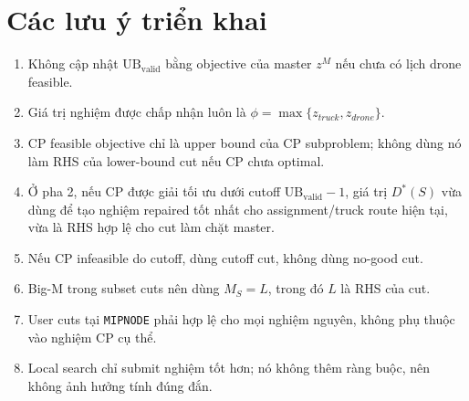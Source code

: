 \documentclass[12pt,a4paper]{article}
\newcommand{\UBV}{\mathrm{UB}_{\mathrm{valid}}}
\begin{document}
\section{Các lưu ý triển khai}
\label{sec:implementation-notes}

\begin{enumerate}[leftmargin=2em]
    \item Không cập nhật $\UBV$ bằng objective của master $z^M$ nếu chưa có lịch drone feasible.
    \item Giá trị nghiệm được chấp nhận luôn là $\phi=\max\{z_{truck},z_{drone}\}$.
    \item CP feasible objective chỉ là upper bound của CP subproblem; không dùng nó làm RHS của lower-bound cut nếu CP chưa optimal.
    \item Ở pha 2, nếu CP được giải tối ưu dưới cutoff $\UBV-1$, giá trị $D^*(S)$ vừa dùng để tạo nghiệm repaired tốt nhất cho assignment/truck route hiện tại, vừa là RHS hợp lệ cho cut làm chặt master.
    \item Nếu CP infeasible do cutoff, dùng cutoff cut, không dùng no-good cut.
    \item Big-M trong subset cuts nên dùng $M_S=L$, trong đó $L$ là RHS của cut.
    \item User cuts tại \texttt{MIPNODE} phải hợp lệ cho mọi nghiệm nguyên, không phụ thuộc vào nghiệm CP cụ thể.
    \item Local search chỉ submit nghiệm tốt hơn; nó không thêm ràng buộc, nên không ảnh hưởng tính đúng đắn.
\end{enumerate}
\end{document}
